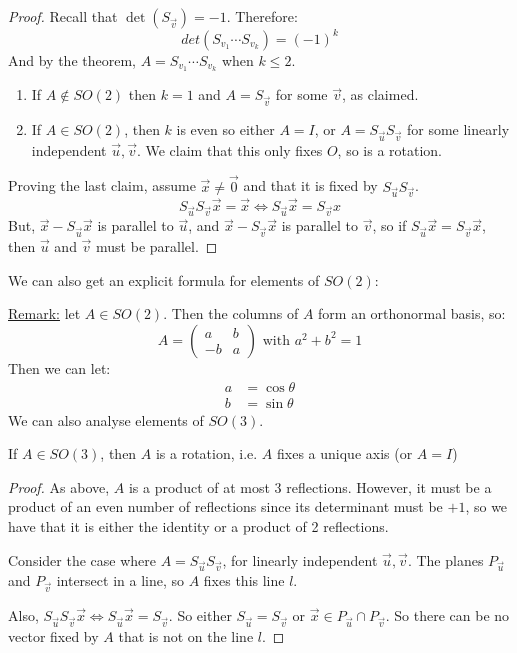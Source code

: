\documentclass[../Main.tex]{subfiles}
\begin{document}
\begin{proof}
    Recall that $\det{(S_{\vec{v}})} = -1$. Therefore:
    \begin{equation*}
        det{(S_{v_1} \cdots S_{v_k})} = (-1)^k
    \end{equation*}
    And by the theorem, $A = S_{v_1} \cdots S_{v_k}$ when $k \leq 2$.
    \begin{enumerate}
        \item If $A \notin SO(2)$ then $k = 1$ and $A = S_\vec{v}$ for some $\vec{v}$, as claimed.
        \item If $A \in SO(2)$, then $k$ is even so either $A = I$, or $A = S_\vec{u} S_\vec{v}$ for some linearly independent $\vec{u}, \vec{v}$. We claim that this only fixes $O$, so is a rotation.
    \end{enumerate}
    Proving the last claim, assume $\vec{x} \neq \vec{0}$ and that it is fixed by $S_\vec{u} S_\vec{v}$.
    \begin{equation*}
        S_\vec{u} S_\vec{v} \vec{x} = \vec{x} \Leftrightarrow S_\vec{u} \vec{x} = S_\vec{v} x
    \end{equation*}
    But, $\vec{x} - S_\vec{u} \vec{x}$ is parallel to $\vec{u}$, and $\vec{x} - S_\vec{v} \vec{x}$ is parallel to $\vec{v}$, so if $S_\vec{u} \vec{x} = S_\vec{v} \vec{x}$, then $\vec{u}$ and $\vec{v}$ must be parallel. \contradiction
\end{proof}
We can also get an explicit formula for elements of $SO(2)$:\par
\underline{Remark:} let $A \in SO(2)$. Then the columns of $A$ form an orthonormal basis, so:
\begin{equation*}
    A =
    \begin{pmatrix}
        a & b \\
        -b & a
    \end{pmatrix}
    \text{ with } a^2 + b^2 = 1
\end{equation*}
Then we can let:
\begin{align*}
    a &= \cos{\theta} \\
    b &= \sin{\theta}
\end{align*}
We can also analyse elements of $SO(3)$.
\begin{lemma}[Elements of $SO(3)$]
    If $A \in SO(3)$, then $A$ is a rotation, i.e. $A$ fixes a unique axis (or $A = I$)
\end{lemma}
\begin{proof}
    As above, $A$ is a product of at most $3$ reflections. However, it must be a product of an even number of reflections since its determinant must be $+1$, so we have that it is either the identity or a product of 2 reflections.\par
    Consider the case where $A = S_\vec{u} S_\vec{v}$, for linearly independent $\vec{u}, \vec{v}$. The planes $P_\vec{u}$ and $P_\vec{v}$ intersect in a line, so $A$ fixes this line $l$.\par
    Also, $S_\vec{u} S_\vec{v} \vec{x} \Leftrightarrow S_\vec{u} \vec{x} = S_\vec{v}$. So either $S_\vec{u} = S_\vec{v}$ or $\vec{x} \in P_\vec{u} \cap P_\vec{v}$. So there can be no vector fixed by $A$ that is not on the line $l$.
\end{proof}
\end{document}
